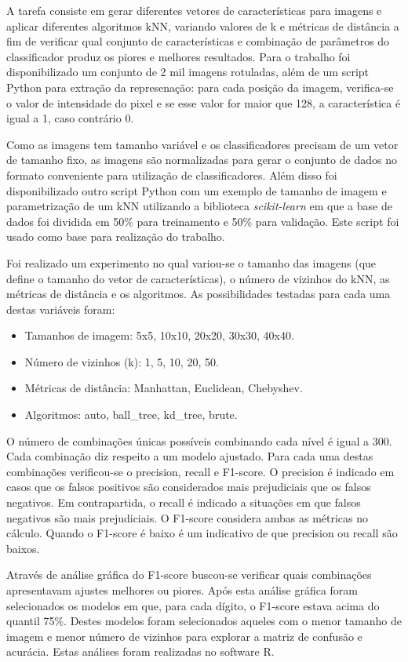 
A tarefa consiste em gerar diferentes vetores de características para imagens e aplicar diferentes algoritmos kNN, variando valores de k e métricas de distância a fim de verificar qual conjunto de características e combinação de parâmetros do classificador produz os piores e melhores resultados. Para o trabalho foi disponibilizado um conjunto de 2 mil imagens rotuladas, além de um script Python para extração da represenação: para cada posição da imagem, verifica-se o valor de intensidade do pixel e se esse valor for maior que 128, a característica é igual a 1, caso contrário 0. 

Como as imagens tem tamanho variável e os classificadores precisam de um vetor de tamanho fixo, as imagens são normalizadas para gerar o conjunto de dados no formato conveniente para utilização de classificadores. Além disso foi disponibilizado outro script Python com um exemplo de tamanho de imagem e parametrização de um kNN utilizando a biblioteca \emph{scikit-learn} em que a base de dados foi dividida em 50\% para treinamento e 50\% para validação. Este script foi usado como base para realização do trabalho.

Foi realizado um experimento no qual variou-se o tamanho das imagens (que define o tamanho do vetor de características), o número de vizinhos do kNN, as métricas de distância e os algoritmos. As possibilidades testadas para cada uma destas variáveis foram:

\begin{itemize}
  \itemsep 0.5ex
  \item Tamanhos de imagem: 5x5, 10x10, 20x20, 30x30, 40x40.
  \item Número de vizinhos (k): 1, 5, 10, 20, 50.
  \item Métricas de distância: Manhattan, Euclidean, Chebyshev.
  \item Algoritmos: auto, ball\_tree, kd\_tree, brute.
\end{itemize}

O número de combinações únicas possíveis combinando cada nível é igual a 300. Cada combinação diz respeito a um modelo ajustado. Para cada uma destas combinações verificou-se o precision, recall e F1-score. O precision é indicado em casos que os falsos positivos são considerados mais prejudiciais que os falsos negativos. Em contrapartida, o recall é indicado a situações em que falsos negativos são mais prejudiciais. O F1-score considera ambas as métricas no cálculo. Quando o F1-score é baixo é um indicativo de que precision ou recall são baixos.

Através de análise gráfica do F1-score buscou-se verificar quais combinações apresentavam ajustes melhores ou piores. Após esta análise gráfica foram selecionados os modelos em que, para cada dígito, o F1-score estava acima do quantil 75\%. Destes modelos foram selecionados aqueles com o menor tamanho de imagem e menor número de vizinhos para explorar a matriz de confusão e acurácia. Estas análises foram realizadas no software R.

